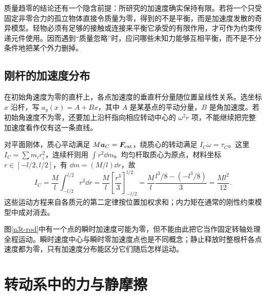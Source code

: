 质量趋零的结论还有一个隐含前提：所研究的加速度确实保持有限。若将一个只受固定非零合力的孤立物体直接令质量为零，得到的不是平衡，而是加速度发散的奇异模型。轻物必须有足够的接触或连接来平衡它承受的有限作用，才可作为约束传递元件使用。因而遇到“质量忽略”时，应问哪些未知力能够互相平衡，而不是不分条件地把某个外力删掉。

\subsection{刚杆的加速度分布}
在初始角速度为零的直杆上，各点加速度的垂直杆分量随位置呈线性关系。选坐标 $x$ 沿杆，写 $a_y(x)=A+Bx$，其中 $A$ 是某基点的平动分量，$B$ 是角加速度。若初始角速度不为零，还要加上沿杆指向相应转动中心的 $\omega^2r$ 项，不能继续把完整加速度看作仅有这一条直线。

对平面刚体，质心平动满足 $M\bm a_C=\bm F_{\rm ext}$，绕质心的转动满足 $I_C\dot\omega=\tau_C$。这里 $I_C=\sum m_ir_i^2$，连续杆则用 $\int r^2\dd m$。均匀杆取质心为原点，材料坐标 $r\in[-l/2,l/2]$，有 $\dd m=(M/l)\dd r$，故
\[
I_C=\frac Ml\int_{-l/2}^{l/2}r^2\dd r
=\frac Ml\left[\frac{r^3}{3}\right]_{-l/2}^{l/2}
=\frac Ml\frac{l^3/8-(-l^3/8)}3
=\frac{Ml^2}{12}.
\]
这些运动方程来自各质元的第二定律按位置加权求和；内力矩在通常的刚性约束模型中成对消去。

图\ref{n3t-rod}中有一个点的瞬时加速度可能为零，但不能由此把它当作固定转轴处理全程运动。瞬时速度中心与瞬时零加速度点也是不同概念；静止释放时整根杆各点速度都为零，只有加速度分布能区分它们随后怎样运动。

\section{转动系中的力与静摩擦}
